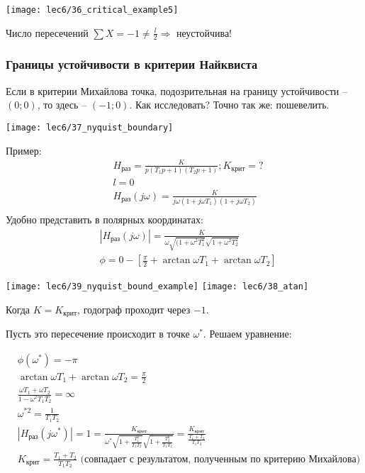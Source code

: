 \documentclass[main.tex]{subfiles}
\begin{document}
\texttt{[image: lec6/36\_critical\_example5]}

Число пересечений $ \sum X = -1 \ne \frac{l}{2} \Rightarrow $ неустойчива!

\subsubsection{Границы устойчивости в критерии Найквиста}

Если в критерии Михайлова точка, подозрительная на границу устойчивости -- $ (0;0) $, то здесь -- $ (-1;0) $.
Как исследовать?
Точно так же: пошевелить.

\texttt{[image: lec6/37\_nyquist\_boundary]}

Пример:
\begin{align*}
    & H_{\text{раз}} = \frac{K}{p(T_1 p + 1)(T_2 p + 1)}; K_{\text{крит}} = ? \\
    & l = 0 \\
    & H_{\text{раз}}(j \omega) = \frac{K}{j \omega(1 + j \omega T_1)(1 + j \omega T_2)} \\
\end{align*}
Удобно представить в полярных координатах:
\begin{align*}
    & | H_{\text{раз}}(j \omega) | = \frac{K}{\omega \sqrt{(1 + \omega^2 T_1^2}\sqrt{1 + \omega^2 T_2^2}} \\
    & \phi = 0 - \left[\frac{\pi}{2} + \arctan \omega T_1 + \arctan \omega T_2 \right]
\end{align*}

\texttt{[image: lec6/39\_nyquist\_bound\_example]}
\texttt{[image: lec6/38\_atan]}

Когда $ K = K_{\text{крит}} $, годограф проходит через $ -1 $.

Пусть это пересечение происходит в точке $ \omega^* $.
Решаем уравнение:

\begin{align*}
    & \phi(\omega^*) = - \pi \\
    & \arctan \omega T_1 + \arctan \omega T_2 = \frac{\pi}{2} \\
    & \frac{\omega T_1 + \omega T_2}{1 - \omega^2 T_1 T_2} = \infty \\
    & \omega^{*2} = \frac{1}{T_1 T_2} \\
    & | H_{\text{раз}}(j \omega^*) | = 1 = \frac{K_{\text{крит}}}{\omega^* \sqrt{1 + \frac{T_1^2}{T_1 T_2}} \sqrt{1 + \frac{T_2^2}{T_1 T_2}}} = \frac{K_{\text{крит}}}{\frac{T_1 + T_2}{T_1 T_2}} \\
    & K_{\text{крит}} = \frac{T_1 + T_2}{T_1 T_2} \text{ (совпадает с результатом, полученным по критерию Михайлова)} \\
\end{align*}
\end{document}
